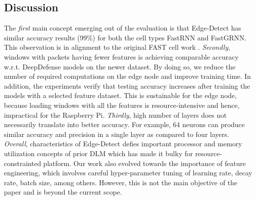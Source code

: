 \documentclass[conference]{IEEEtran}
\begin{document}
\subsection{Discussion}
\noindent The \textit{first} main concept emerging out of the evaluation is that Edge-Detect has similar accuracy results (99\%) for both the cell types FastRNN and FastGRNN. This observation is in alignment to the original FAST cell work \cite{kusupati2018fastgrnn}. 
\textit{Secondly}, windows with packets having fewer features is achieving comparable accuracy w.r.t. DeepDefense models on the newer dataset. 
By doing so,  we  reduce  the  number  of  required  computations on the edge node and  improve training time.  In addition, the experiments verify that testing accuracy increases after training the models with a selected feature dataset.
This is sustainable for the edge node, because loading windows with all the features is resource-intensive and hence, impractical for the Raspberry Pi. 
\textit{Thirdly}, high number of layers does not necessarily translate into better accuracy. For example, 64 neurons can produce similar accuracy and precision in a single layer as compared to four layers.  
\textit{Overall}, characteristics of Edge-Detect defies important processor and memory utilization concepts of prior DLM which has made it bulky for resource-constrainted platform. Our work also evolved towards the importance of feature engineering, which involves careful hyper-parameter tuning of learning rate, decay rate, batch size, among others. However, this is not the main objective of the paper and is beyond the current scope. 
\end{document}
